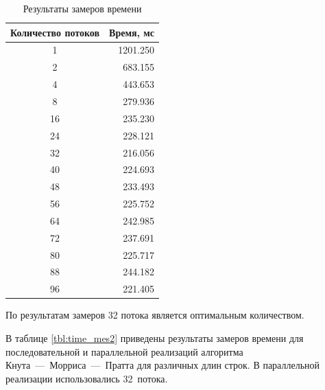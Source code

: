 \begin{table}[H]
	\begin{center}
		\begin{threeparttable}
			\captionsetup{justification=raggedright, singlelinecheck=off}
			\caption{Результаты замеров времени}
			\label{tbl:time_mes}
			\begin{tabular}{|c|r|}
				\hline
				Количество потоков & Время, мс \\ \hline
				1 & 1201.250\\ \hline
				2 & 683.155\\ \hline
				4 & 443.653\\ \hline
				8 & 279.936\\ \hline
				16 & 235.230\\ \hline
				24 & 228.121\\ \hline
				32 & 216.056\\ \hline
				40 & 224.693\\ \hline
				48 & 233.493\\ \hline
				56 & 225.752\\ \hline
				64 & 242.985\\ \hline
				72 & 237.691\\ \hline
				80 & 225.717\\ \hline
				88 & 244.182\\ \hline
				96 & 221.405\\ \hline
				
			\end{tabular}
		\end{threeparttable}
	\end{center}
\end{table}

По результатам замеров 32 потока является оптимальным количеством.

В таблице \ref{tbl:time_mes2} приведены результаты замеров времени для последовательной и параллельной реализаций алгоритма Кнута~---~Морриса~---~Пратта для различных длин строк. В параллельной реализации использовались 32~потока.

